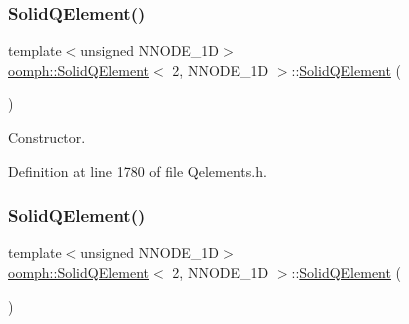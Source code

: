 \subsubsection{\texorpdfstring{Solid\+Q\+Element()}{SolidQElement()}\hspace{0.1cm}{\footnotesize\ttfamily [1/2]}}
{\footnotesize\ttfamily template$<$unsigned N\+N\+O\+D\+E\+\_\+1D$>$ \\
\hyperlink{classoomph_1_1SolidQElement}{oomph\+::\+Solid\+Q\+Element}$<$ 2, N\+N\+O\+D\+E\+\_\+1D $>$\+::\hyperlink{classoomph_1_1SolidQElement}{Solid\+Q\+Element} (\begin{DoxyParamCaption}{ }\end{DoxyParamCaption})\hspace{0.3cm}{\ttfamily [inline]}}



Constructor. 



Definition at line 1780 of file Qelements.\+h.

\mbox{\label{classoomph_1_1SolidQElement_3_012_00_01NNODE__1D_01_4_af2633daba0fe1bd2f69fb2ac15996c9a}} 
\subsubsection{\texorpdfstring{Solid\+Q\+Element()}{SolidQElement()}\hspace{0.1cm}{\footnotesize\ttfamily [2/2]}}
{\footnotesize\ttfamily template$<$unsigned N\+N\+O\+D\+E\+\_\+1D$>$ \\
\hyperlink{classoomph_1_1SolidQElement}{oomph\+::\+Solid\+Q\+Element}$<$ 2, N\+N\+O\+D\+E\+\_\+1D $>$\+::\hyperlink{classoomph_1_1SolidQElement}{Solid\+Q\+Element} (\begin{DoxyParamCaption}\item[{const \hyperlink{classoomph_1_1SolidQElement}{Solid\+Q\+Element}$<$ 2, N\+N\+O\+D\+E\+\_\+1D $>$ \&}]{ }\end{DoxyParamCaption})\hspace{0.3cm}{\ttfamily [inline]}}



